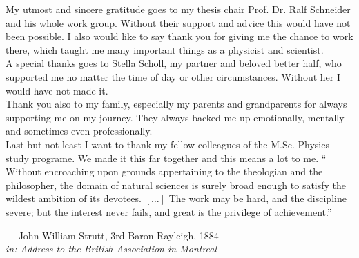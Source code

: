 \documentclass[
	12pt,
	twoside,
	chapterinoneline,
	onehalfspacing, %
	nolistspacing, %
	parskip, %
	headsepline, %
	english,
]{MastersDoctoralThesis} %
\begin{document}
	
%
	\printbibliography[heading=bibintoc]
%
				\clearpage
				\pagestyle{empty}
				\begin{center}{%
					\huge\textit{\acknowledgementname}\bigskip%
				}\end{center}
        My utmost and sincere gratitude goes to my thesis chair Prof. Dr. Ralf Schneider %
        and his whole work group. Without their support and advice this would have not been possible. %
        I also would like to say thank you for giving me the chance to work there, %
        which taught me many important things as a physicist and scientist.\\
        A special thanks goes to Stella Scholl, my partner and beloved better half, who supported %
        me no matter the time of day or other circumstances. Without her I would have not made it.\\
        Thank you also to my family, especially my parents and grandparents %
        for always supporting me on my journey. They %
        always backed me up emotionally, mentally and sometimes even professionally.\\
        Last but not least I want to thank my fellow colleagues of the M.Sc. Physics %
				study programe. We made it this far together and this means a lot to me.
	 \clearpage
%
  \pagestyle{empty}
	\enquote{%
		Without encroaching upon grounds appertaining to the theologian and the
		philosopher, the domain of natural sciences is surely broad enough to
		satisfy the wildest ambition of its devotees. $\left[\dots\right]$
		The work may be hard, and the discipline severe; but the interest never
		fails, and great is the privilege of achievement.}%
	\bigbreak%
	\begin{flushright}
		--- John William Strutt, 3rd Baron Rayleigh, 1884\\
		\small\emph{in: Address to the British Association in Montreal}
	\end{flushright}
\end{document}
